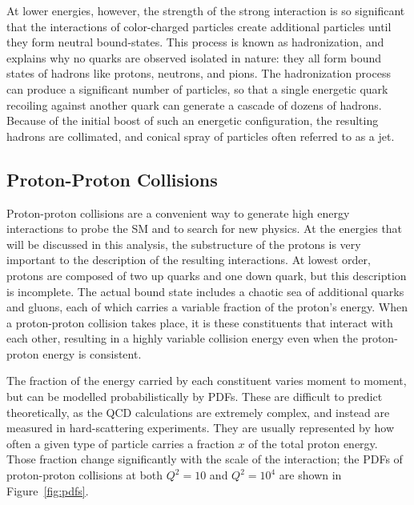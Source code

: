 At lower energies, however, the strength of the strong interaction is so significant that the interactions of color-charged particles create additional particles until they form neutral bound-states.
This process is known as hadronization, and explains why no quarks are observed isolated in nature: they all form bound states of hadrons like protons, neutrons, and pions.
The hadronization process can produce a significant number of particles, so that a single energetic quark recoiling against another quark can generate a cascade of dozens of hadrons.
Because of the initial boost of such an energetic configuration, the resulting hadrons are collimated, and conical spray of particles often referred to as a jet.

\subsection{Proton-Proton Collisions}

Proton-proton collisions are a convenient way to generate high energy interactions to probe the \ac{SM} and to search for new physics.
At the energies that will be discussed in this analysis, the substructure of the protons is very important to the description of the resulting interactions.
At lowest order, protons are composed of two up quarks and one down quark, but this description is incomplete.
The actual bound state includes a chaotic sea of additional quarks and gluons, each of which carries a variable fraction of the proton's energy.
When a proton-proton collision takes place, it is these constituents that interact with each other, resulting in a highly variable collision energy even when the proton-proton energy is consistent.

The fraction of the energy carried by each constituent varies moment to moment, but can be modelled probabilistically by \acp{PDF}.
These are difficult to predict theoretically, as the \ac{QCD} calculations are extremely complex, and instead are measured in hard-scattering experiments.
They are usually represented by how often a given type of particle carries a fraction $x$ of the total proton energy.
Those fraction change significantly with the scale of the interaction; the \acp{PDF} of proton-proton collisions at both $Q^2 = 10$ \GeV{} and $Q^2 = 10^4$ \GeV{} are shown in Figure~\ref{fig:pdfs}.

